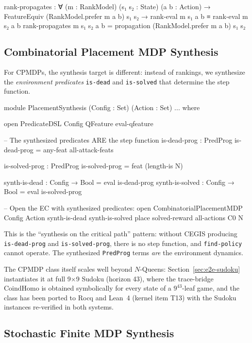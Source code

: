 \documentclass[9pt,a4paper]{article}
\theoremstyle{plain}
\theoremstyle{definition}
\theoremstyle{remark}
\begin{document}
\begin{spec}
    rank-propagates : ∀ (m : RankModel) (s₁ s₂ : State) (a b : Action) →
      FeatureEquiv (RankModel.prefer m a b) s₁ s₂ →
      rank-eval m s₁ a b ≡ rank-eval m s₂ a b
    rank-propagates m s₁ s₂ a b = propagation (RankModel.prefer m a b) s₁ s₂
\end{spec}

\subsection{Combinatorial Placement MDP Synthesis}
\label{sec:cpmdp-synthesis}

For CPMDPs, the synthesis target is different: instead of rankings, we synthesize the \emph{environment predicates} \texttt{is-dead} and \texttt{is-solved} that determine the step function.

\begin{spec}
module PlacementSynthesis (Config : Set) (Action : Set) ... where

  open PredicateDSL Config QFeature eval-qfeature

  -- The synthesized predicates ARE the step function
  is-dead-prog : PredProg
  is-dead-prog = any-feat all-attack-feats

  is-solved-prog : PredProg
  is-solved-prog = feat (length-is N)

  synth-is-dead   : Config → Bool = eval is-dead-prog
  synth-is-solved : Config → Bool = eval is-solved-prog

  -- Open the EC with synthesized predicates:
  open CombinatorialPlacementMDP Config Action
    synth-is-dead synth-is-solved place solved-reward all-actions C0 N
\end{spec}

\noindent This is the ``synthesis on the critical path'' pattern: without CEGIS producing \texttt{is-dead-prog} and \texttt{is-solved-prog}, there is no step function, and \texttt{find-policy} cannot operate.  The synthesized \texttt{PredProg} terms \emph{are} the environment dynamics.

The CPMDP class itself scales well beyond $N$-Queens: Section~\ref{sec:e2e-sudoku} instantiates it at full 9$\times$9 Sudoku (horizon 43), where the trace-bridge CoindHomo is obtained symbolically for every state of a $9^{43}$-leaf game, and the class has been ported to Rocq and Lean~4 (kernel item T13) with the Sudoku instances re-verified in both systems.

\subsection{Stochastic Finite MDP Synthesis}
\label{sec:stochastic-synthesis}
\end{document}
